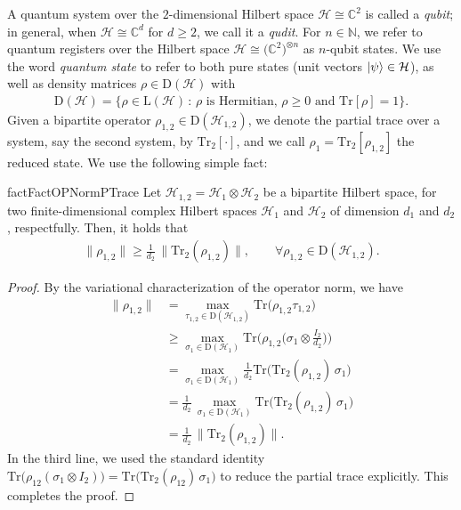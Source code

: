 \documentclass[11pt]{article}
\theoremstyle{plain}
\begin{document}
A quantum system over the $2$-dimensional Hilbert space $\mathcal H \cong \mathbb{C}^2$ is called a \emph{qubit}; in general, when $\mathcal H \cong \mathbb{C}^d$ for $d \geq 2$, we call it a \emph{qudit}. For $n \in \mathbb{N}$, we refer to quantum registers over the Hilbert space $\mathcal H \cong \big(\mathbb{C}^2\big)^{\otimes n}$ as $n$-qubit states. We use the word \emph{quantum state} to refer to both pure states (unit vectors $\ket{\psi} \in \mathcal H$), as well as density matrices $\rho \in \mathrm{D}(\mathcal H)$ with
\begin{align}
\mathrm{D}(\mathcal H) = \{ \rho \in \mathrm{L}(\mathcal{H}) \, : \, \rho \text{ is Hermitian, $\rho \geq 0$ and  } \mathrm{Tr}[\rho] =1\}.    
\end{align}
Given a bipartite operator $\rho_{1,2} \in \mathrm{D}(\mathcal H_{1,2})$, we denote the partial trace over a system, say the second system, by $\mathrm{Tr}_2[\cdot]$, and we call $\rho_1=\mathrm{Tr}_2[\rho_{1,2}]$ the reduced state. We use the following simple fact:
\begin{restatable}{fact}{FactOPNormPTrace} \label{fact:op-norm-ptrace}
    Let $\mathcal H_{1,2} = \mathcal H_{1} \otimes \mathcal H_{2}$ be a bipartite Hilbert space, for two finite-dimensional complex Hilbert spaces $\mathcal H_{1}$ and $\mathcal H_{2}$ of dimension $d_1$ and $d_2$, respectfully. Then, it holds that
    \begin{align}
        \|\rho_{1,2}\| \geq \frac{1}{d_2} \, \|\mathrm{Tr}_2(\rho_{1,2})\|, \quad \quad \forall \rho_{1,2} \in \mathrm{D}(\mathcal H_{1,2}).
        \end{align}
\end{restatable}

\begin{proof}
By the variational characterization of the operator norm, we have
\begin{align*}
\|\rho_{1,2}\| 
&= \max_{\tau_{1,2} \in \mathrm{D}(\mathcal H_{1,2})} \mathrm{Tr}\big(\rho_{1,2} \tau_{1,2}\big) \\
&\ge \max_{\sigma_1 \in \mathrm{D}(\mathcal H_1)} \mathrm{Tr}\Big(\rho_{1,2} \big(\sigma_1 \otimes \frac{I_2}{d_2}\big)\Big) \\
&= \max_{\sigma_1 \in \mathrm{D}(\mathcal H_1)} \frac{1}{d_2} \mathrm{Tr}\big( \mathrm{Tr}_2(\rho_{1,2}) \, \sigma_1 \big) \\
&= \frac{1}{d_2} \, \max_{\sigma_1 \in \mathrm{D}(\mathcal H_1)} \mathrm{Tr}\big( \mathrm{Tr}_2(\rho_{1,2}) \, \sigma_1 \big) \\
&= \frac{1}{d_2} \, \|\mathrm{Tr}_2(\rho_{1,2})\|.
\end{align*}
In the third line, we used the standard identity $\mathrm{Tr}\big(\rho_{12} (\sigma_1 \otimes I_2)\big) = \mathrm{Tr}\big(\mathrm{Tr}_2(\rho_{12}) \, \sigma_1\big)$
to reduce the partial trace explicitly. This completes the proof.
\end{proof}
\end{document}
